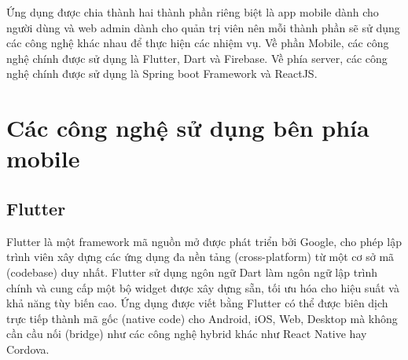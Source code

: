 \documentclass[../DoAn.tex]{subfiles}
\begin{document}





Ứng dụng được chia thành hai thành phần riêng biệt là app mobile dành cho người dùng và web admin dành cho quản trị viên nên mỗi thành phần sẽ sử dụng các công nghệ khác nhau để thực hiện các nhiệm vụ. Về phần Mobile, các công nghệ chính được sử dụng là Flutter\cite{Flutter}, Dart\cite{Dart} và Firebase\cite{Firebase}. Về phía server, các công nghệ chính được sử dụng là Spring boot Framework\cite{SBF} và ReactJS\cite{ReactJS}. 

\section{Các công nghệ sử dụng bên phía mobile}
\subsection{Flutter\cite{Flutter}}
Flutter là một framework mã nguồn mở được phát triển bởi Google, cho phép lập trình viên xây dựng các ứng dụng đa nền tảng (cross-platform) từ một cơ sở mã (codebase) duy nhất. Flutter sử dụng ngôn ngữ Dart làm ngôn ngữ lập trình chính và cung cấp một bộ widget được xây dựng sẵn, tối ưu hóa cho hiệu suất và khả năng tùy biến cao. Ứng dụng được viết bằng Flutter có thể được biên dịch trực tiếp thành mã gốc (native code) cho Android, iOS, Web, Desktop mà không cần cầu nối (bridge) như các công nghệ hybrid khác như React Native hay Cordova.
\end{document}
